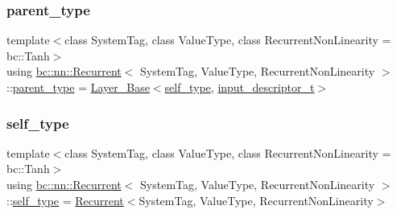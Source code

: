 \mbox{\label{structbc_1_1nn_1_1Recurrent_a8c8966c1c72d6a30be5b89408b78b105}} 
\subsubsection{\texorpdfstring{parent\+\_\+type}{parent\_type}}
{\footnotesize\ttfamily template$<$class System\+Tag, class Value\+Type, class Recurrent\+Non\+Linearity = bc\+::\+Tanh$>$ \\
using \hyperlink{structbc_1_1nn_1_1Recurrent}{bc\+::nn\+::\+Recurrent}$<$ System\+Tag, Value\+Type, Recurrent\+Non\+Linearity $>$\+::\hyperlink{structbc_1_1nn_1_1Recurrent_a8c8966c1c72d6a30be5b89408b78b105}{parent\+\_\+type} =  \hyperlink{structbc_1_1nn_1_1Layer__Base}{Layer\+\_\+\+Base}$<$\hyperlink{structbc_1_1nn_1_1Recurrent_ab049bf64fd16f982e5b52b185669488d}{self\+\_\+type}, \hyperlink{structbc_1_1nn_1_1Recurrent_a5b3abbc190059309b64aff068cc38f6a}{input\+\_\+descriptor\+\_\+t}$>$}

\mbox{\label{structbc_1_1nn_1_1Recurrent_ab049bf64fd16f982e5b52b185669488d}} 
\subsubsection{\texorpdfstring{self\+\_\+type}{self\_type}}
{\footnotesize\ttfamily template$<$class System\+Tag, class Value\+Type, class Recurrent\+Non\+Linearity = bc\+::\+Tanh$>$ \\
using \hyperlink{structbc_1_1nn_1_1Recurrent}{bc\+::nn\+::\+Recurrent}$<$ System\+Tag, Value\+Type, Recurrent\+Non\+Linearity $>$\+::\hyperlink{structbc_1_1nn_1_1Recurrent_ab049bf64fd16f982e5b52b185669488d}{self\+\_\+type} =  \hyperlink{structbc_1_1nn_1_1Recurrent}{Recurrent}$<$System\+Tag, Value\+Type, Recurrent\+Non\+Linearity$>$}

\mbox{\label{structbc_1_1nn_1_1Recurrent_a4342e7f5393c7fa645eb4f314a762906}} 
